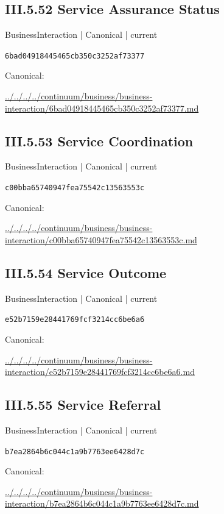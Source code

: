 \documentclass[10pt,a4paper]{article}
\begin{document}
\subsection*{III.5.52 Service Assurance Status}
\label{element-6bad04918445465cb350c3252af73377}
{\small BusinessInteraction | Canonical | current}\par
\texttt{6bad04918445465cb350c3252af73377}\par
Canonical: \par
{\footnotesize\url{../../../../continuum/business/business-interaction/6bad04918445465cb350c3252af73377.md}}\par
\subsection*{III.5.53 Service Coordination}
\label{element-c00bba65740947fea75542c13563553c}
{\small BusinessInteraction | Canonical | current}\par
\texttt{c00bba65740947fea75542c13563553c}\par
Canonical: \par
{\footnotesize\url{../../../../continuum/business/business-interaction/c00bba65740947fea75542c13563553c.md}}\par
\subsection*{III.5.54 Service Outcome}
\label{element-e52b7159e28441769fcf3214cc6be6a6}
{\small BusinessInteraction | Canonical | current}\par
\texttt{e52b7159e28441769fcf3214cc6be6a6}\par
Canonical: \par
{\footnotesize\url{../../../../continuum/business/business-interaction/e52b7159e28441769fcf3214cc6be6a6.md}}\par
\subsection*{III.5.55 Service Referral}
\label{element-b7ea2864b6c044c1a9b7763ee6428d7c}
{\small BusinessInteraction | Canonical | current}\par
\texttt{b7ea2864b6c044c1a9b7763ee6428d7c}\par
Canonical: \par
{\footnotesize\url{../../../../continuum/business/business-interaction/b7ea2864b6c044c1a9b7763ee6428d7c.md}}\par
\end{document}

